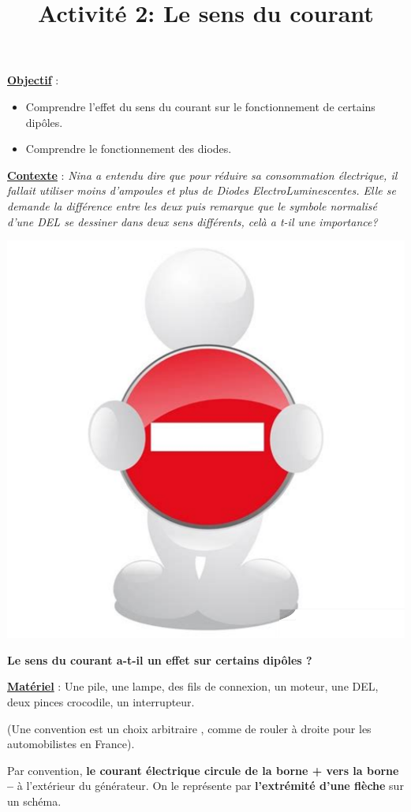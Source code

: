 \documentclass[10pt]{article}
\newcommand{\titreActivite}{Activité 2: Le sens du courant} %
\newcommand{\objectif}{ 	
	
	\begin{itemize}
		\item Comprendre l'effet du sens du courant sur le fonctionnement de certains dipôles.
		\item Comprendre le fonctionnement des diodes.
	\end{itemize}
}
\newcommand{\contexte}{
	Nina a entendu dire que pour réduire sa consommation électrique, 
	il fallait utiliser moins d'ampoules et plus de Diodes ElectroLuminescentes. 
	Elle se demande la différence entre les deux puis remarque que le symbole normalisé d'une DEL
	se dessiner dans deux sens différents, celà a t-il une importance?
}
\newcommand{\resumeContexte}{
	Le sens du courant a-t-il un effet sur certains dipôles ?
}
\begin{document}
\date{}
\title{\titreActivite}
\maketitle %


\underline{\textbf{Objectif}} :  \vspace{2pt}
\objectif

\vspace{4pt}

\underline{\textbf{Contexte}} :  \textit{\contexte}

\begin{center}
	\includegraphics[width=0.35\columnwidth]{activité.png} %
\end{center}
\textbf{\resumeContexte}


\vspace{-12pt}


\textbf{\underline{Matériel}} : Une pile, une lampe, des fils de connexion, un moteur, une DEL, deux pinces
 crocodile, un
interrupteur.


\begin{mybox}[Convention]
	(Une convention est un choix arbitraire
	, comme de rouler à droite pour les automobilistes en France). 
	
	Par convention,
	\textbf{le courant électrique circule de la borne +
	vers la borne –} à l’extérieur du générateur.
	On le représente par \textbf{l’extrémité d’une flèche} sur un schéma.

\end{mybox}
\end{document}
